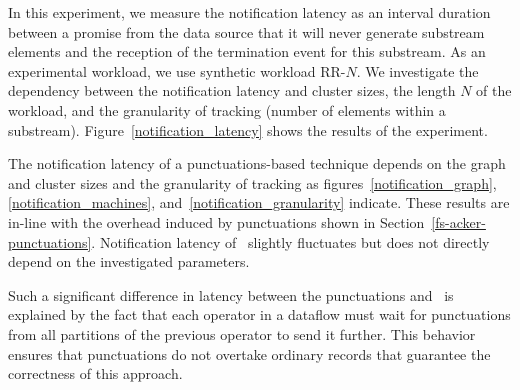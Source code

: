 
In this experiment, we measure the notification latency as an interval duration between a promise from the data source that it will never generate substream elements and the reception of the termination event for this substream. As an experimental workload, we use synthetic workload RR-$N$. We investigate the dependency between the notification latency and cluster sizes, the length $N$ of the workload, and the granularity of tracking (number of elements within a substream). Figure~\ref{notification_latency} shows the results of the experiment. 

The notification latency of a punctuations-based technique depends on the graph and cluster sizes and the granularity of tracking as figures~\ref{notification_graph},\ref{notification_machines}, and~\ref{notification_granularity} indicate. These results are in-line with the overhead induced by punctuations shown in Section~\ref{fs-acker-punctuations}. Notification latency of \tracker\ slightly fluctuates but does not directly depend on the investigated parameters.

Such a significant difference in latency between the punctuations and \tracker\ is explained by the fact that each operator in a dataflow must wait for punctuations from all partitions of the previous operator to send it further. This behavior ensures that punctuations do not overtake ordinary records that guarantee the correctness of this approach.

